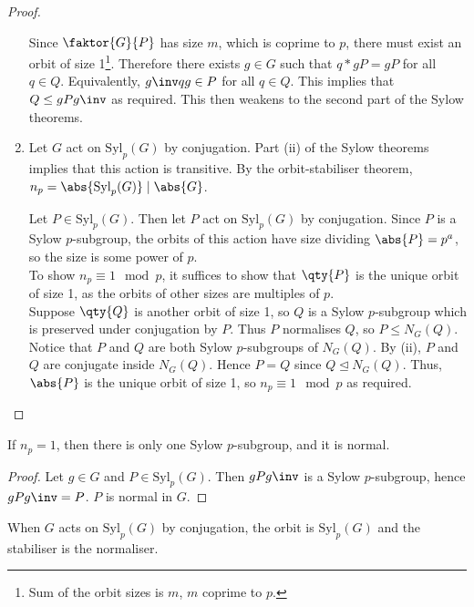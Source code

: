 \begin{proof}
\begin{enumerate}
		      Since $\faktor{G}{P}$ has size $m$, which is coprime to $p$, there must exist an orbit of size 1\footnote{Sum of the orbit sizes is $m$, $m$ coprime to $p$.}.
		      Therefore there exists $g \in G$ such that $q \ast gP = gP$ for all $q \in Q$.
		      Equivalently, $g\inv q g \in P$ for all $q \in Q$.
		      This implies that $Q \leq gPg\inv$ as required.
		      This then weakens to the second part of the Sylow theorems.
		\item Let $G$ act on $\mathrm{Syl}_p(G)$ by conjugation.
		      Part (ii) of the Sylow theorems implies that this action is transitive.
		      By the orbit-stabiliser theorem, $n_p = \abs{\mathrm{Syl}_p(G)} \mid \abs{G}$.

		      Let $P \in \mathrm{Syl}_p(G)$.
		      Then let $P$ act on $\mathrm{Syl}_p(G)$ by conjugation.
		      Since $P$ is a Sylow $p$-subgroup, the orbits of this action have size dividing $\abs{P} = p^a$, so the size is some power of $p$. \\
		      To show $n_p \equiv 1 \mod p$, it suffices to show that $\qty{P}$ is the unique orbit of size 1, as the orbits of other sizes are multiples of $p$. \\
		      Suppose $\qty{Q}$ is another orbit of size 1, so $Q$ is a Sylow $p$-subgroup which is preserved under conjugation by $P$.
		      Thus $P$ normalises $Q$, so $P \leq N_G(Q)$.
		      Notice that $P$ and $Q$ are both Sylow $p$-subgroups of $N_G(Q)$.
		      By (ii), $P$ and $Q$ are conjugate inside $N_G(Q)$.
		      Hence $P = Q$ since $Q \trianglelefteq N_G(Q)$.
		      Thus, $\abs{P}$ is the unique orbit of size 1, so $n_p \equiv 1 \mod p$ as required.
	\end{enumerate}
\end{proof}

\begin{corollary}
	If $n_p = 1$, then there is only one Sylow $p$-subgroup, and it is normal.
\end{corollary}

\begin{proof}
	Let $g \in G$ and $P \in \mathrm{Syl}_p(G)$.
	Then $g P g\inv$ is a Sylow $p$-subgroup, hence $g P g\inv = P$.
	$P$ is normal in $G$.
\end{proof}

\begin{remark}
	When $G$ acts on $\mathrm{Syl}_p(G)$ by conjugation, the orbit is $\mathrm{Syl}_p(G)$ and the stabiliser is the normaliser.  
\end{remark}

